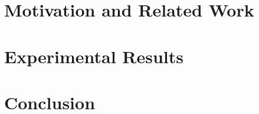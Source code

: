\documentclass{sig-alternate}
\begin{document}
\label{sec:related}


\section{Motivation and Related Work}
\label{sec:dbfail}


\label{sec:compiler}


\section{Experimental Results}
\label{sec:experiments}


\section{Conclusion}


\end{document}
